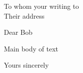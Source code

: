 \documentclass[12pt,dvips]{letter}
\begin{document}
   
   \address
   {
     Name \\
     email @auckand.ac.nz
     Auckland Bioengineering Institute \\
     The University of Auckland \\
   }   
   \begin{letter}
   {
     To whom your writing to \\
     Their address\\
   }
     
   \opening{Dear Bob}

      Main body of text

   \signature{Your name again}
   \closing {Yours sincerely \etc}
   \end{letter}
\end{document}
